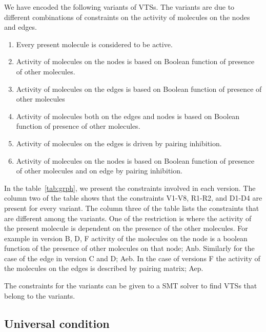 We have encoded the following variants of VTSs.
%
The variants are due to different combinations of constraints on the
activity of molecules on the nodes and edges.
%
\begin{enumerate}
\item Every present molecule is considered to be active.
\item Activity of molecules on the nodes is based on Boolean function of presence of other molecules. 
\item Activity of molecules on the edges is based on Boolean function of presence of other molecules
\item Activity of molecules both on the edges and nodes is based on Boolean function of presence of other molecules.
\item Activity of molecules on the edges is driven by pairing inhibition.
\item Activity of molecules on the nodes is based on Boolean function of presence of other molecules and on edge by pairing inhibition.
\end{enumerate}
%
%
In the table~\ref{tab:grph}, we present the constraints involved in each version.
%
The column two of the table shows that the constraints V1-V8, R1-R2, and D1-D4 are present
for every variant.
%
The column three of the table lists the constraints that are different among the variants.
%
%
One of the restriction is where the activity of the present molecule is dependent on the presence of the other molecules.
%
For example in version B, D, F activity of the molecules on the node is a boolean function of the presence of other molecules on that node; Anb.
%
Similarly for the case of the edge in version C and D; Aeb.
%
In the case of versions F the activity of the molecules on the edges
is described by pairing matrix; Aep.

%
The constraints for the variants can be given to a SMT solver to find
VTSs that belong to the variants.

\subsection{Universal condition}


               
